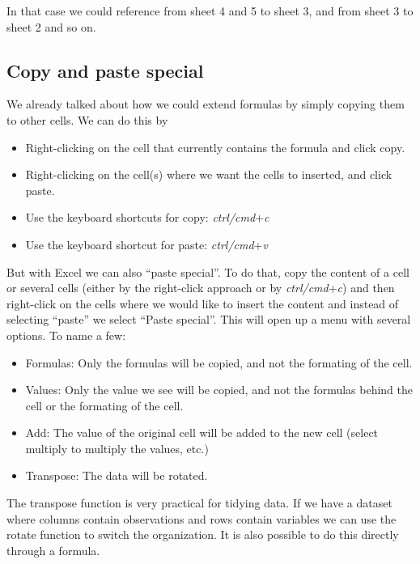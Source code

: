 \documentclass[]{book}
\providecommand{\tightlist}{%
  \setlength{\itemsep}{0pt}\setlength{\parskip}{0pt}}
\begin{document}
In that case we could reference from sheet 4 and 5 to sheet 3, and from sheet 3 to sheet 2 and so on.

\hypertarget{copy-and-paste-special}{%
\subsection{Copy and paste special}\label{copy-and-paste-special}}

We already talked about how we could extend formulas by simply copying them to other cells. We can do this by

\begin{itemize}
\tightlist
\item
  Right-clicking on the cell that currently contains the formula and click copy.
\item
  Right-clicking on the cell(s) where we want the cells to inserted, and click paste.
\item
  Use the keyboard shortcuts for copy: \emph{ctrl/cmd}+\emph{c}
\item
  Use the keyboard shortcut for paste: \emph{ctrl/cmd}+\emph{v}
\end{itemize}

But with Excel we can also ``paste special''. To do that, copy the content of a cell or several cells (either by the right-click approach or by \emph{ctrl/cmd}+\emph{c}) and then right-click on the cells where we would like to insert the content and instead of selecting ``paste'' we select ``Paste special''. This will open up a menu with several options. To name a few:

\begin{itemize}
\tightlist
\item
  Formulas: Only the formulas will be copied, and not the formating of the cell.
\item
  Values: Only the value we see will be copied, and not the formulas behind the cell or the formating of the cell.
\item
  Add: The value of the original cell will be added to the new cell (select multiply to multiply the values, etc.)
\item
  Transpose: The data will be rotated.
\end{itemize}

The transpose function is very practical for tidying data. If we have a dataset where columns contain observations and rows contain variables we can use the rotate function to switch the organization. It is also possible to do this directly through a formula.
\end{document}

